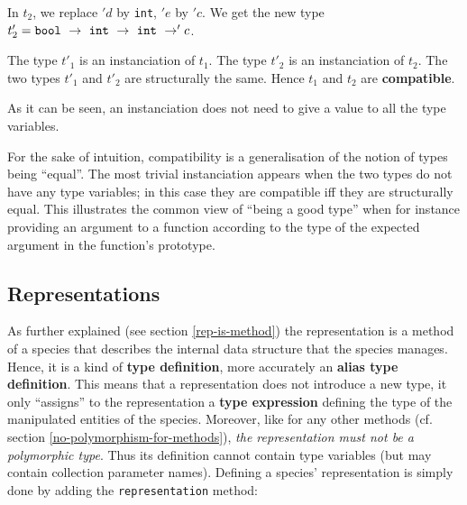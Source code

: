 In $t_2$, we replace $'d$ by {\tt int}, $'e$ by $'c$. We get the new
type
$t'_2 = {\tt bool\ } \rightarrow {\tt\ int\ } \rightarrow {\tt\ int\ } \rightarrow 'c$.

The type $t'_1$ is an instanciation of $t_1$. The type $t'_2$ is an
instanciation of $t_2$. The two types $t'_1$ and $t'_2$ are
structurally the same. Hence $t_1$ and $t_2$ are {\bf compatible}.

As it can be seen, an instanciation does not need to give a value to all the
type variables.

\medskip
For the sake of intuition, compatibility is a generalisation of
the notion of types being ``equal''. The most trivial instanciation
appears when the two types do not have any type variables; in
this case they are compatible iff they are structurally equal. This
illustrates the common view of ``being a good type'' when for
instance providing an argument to a function according to the type of
the expected argument in the function's prototype.


\subsection{Representations}\label{representation-type}
As further explained (see section \ref{rep-is-method}) the
representation is a method of a species that describes the internal
data structure that the species manages. Hence, it is a kind of {\bf
  type definition}, more accurately an {\bf alias type
  definition}. This means that a representation does not introduce a
new type, it only ``assigns'' to the representation a {\bf type
  expression} defining the type of the manipulated entities of the
species. Moreover, like for any other methods (cf. section
\ref{no-polymorphism-for-methods}), {\em the representation must not
  be a polymorphic type}. Thus its definition cannot
contain type variables (but may contain collection parameter
names). Defining a species' representation is simply done by adding the
{\tt representation} method:


